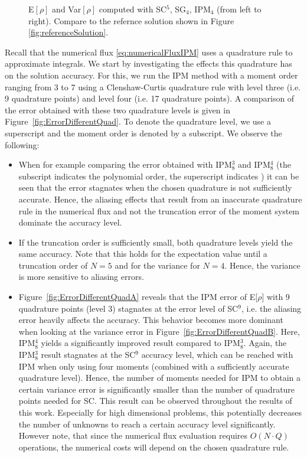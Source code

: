 \begin{figure}[h!]
\begin{subfigure}{0.3\linewidth}
		\label{fig:sub1}
	\end{subfigure}
	\caption{E$[\rho]$ and Var$[\rho]$ computed with SC$^5$, SG$_4$, IPM$_4$ (from left to right). Compare to the refernce solution shown in Figure \ref{fig:referenceSolution}.}
	\label{fig:ERhoVarRho5}
\end{figure}

Recall that the numerical flux \eqref{eq:numericalFluxIPM} uses a quadrature rule to approximate integrals. We start by investigating the effects this quadrature has on the solution accuracy. For this, we run the IPM method with a moment order ranging from 3 to 7 using a Clenshaw-Curtis quadrature rule with level three (i.e. 9 quadrature points) and level four (i.e. 17 quadrature points). A comparison of the error obtained with these two quadrature levels is given in Figure~\ref{fig:ErrorDifferentQuad}. To denote the quadrature level, we use a superscript and the moment order is denoted by a subscript. We observe the following:
\begin{itemize}
\item When for example comparing the error obtained with IPM$_8^3$ and IPM$_8^4$ (the subscript indicates the polynomial order, the superscript indicates ) it can be seen that the error stagnates when the chosen quadrature is not sufficiently accurate. Hence, the aliasing effects that result from an inaccurate quadrature rule in the numerical flux and not the truncation error of the moment system dominate the accuracy level.
\item If the truncation order is sufficiently small, both quadrature levels yield the same accuracy. Note that this holds for the expectation value until a truncation order of $N=5$ and for the variance for $N=4$. Hence, the variance is more sensitive to aliasing errors.
\item Figure~\ref{fig:ErrorDifferentQuadA} reveals that the IPM error of E[$\rho$] with 9 quadrature points (level 3) stagnates at the error level of SC$^9$, i.e. the aliasing error heavily affects the accuracy. This behavior becomes more dominant when looking at the variance error in Figure~\ref{fig:ErrorDifferentQuadB}. Here, IPM$_8^4$ yields a significantly improved result compared to IPM$_8^3$. Again, the IPM$_8^3$ result stagnates at the SC$^9$ accuracy level, which can be reached with IPM when only using four moments (combined with a sufficiently accurate quadrature level). Hence, the number of moments needed for IPM to obtain a certain variance error is significantly smaller than the number of quadrature points needed for SC. This result can be observed throughout the results of this work. Especially for high dimensional problems, this potentially decreases the number of unknowns to reach a certain accuracy level significantly. However note, that since the numerical flux evaluation requires $O(N\cdot Q)$ operations, the numerical costs will depend on the chosen quadrature rule.
\end{itemize}
